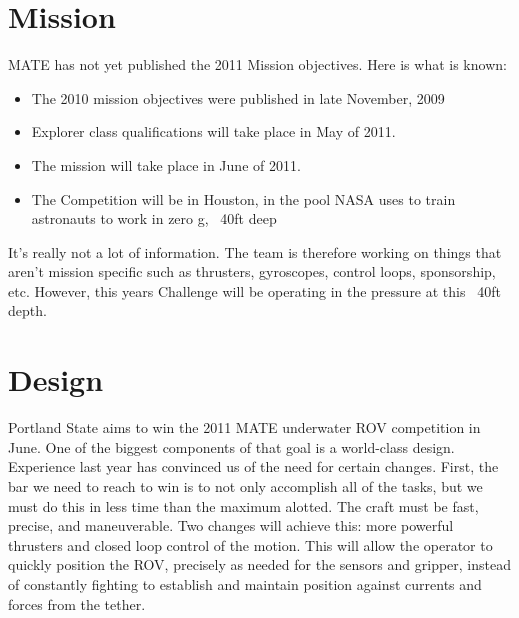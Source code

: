 \documentclass{proposalnsf}
\begin{document}
\section{Mission}

MATE has not yet published the 2011 Mission objectives. Here is what is known:
\begin{itemize}
\item The 2010 mission objectives were published in late November, 2009
\item Explorer class qualifications will take place in May of 2011.
\item The mission will take place in June of 2011.
\item The Competition will be in Houston, in the pool NASA uses to train astronauts to work in zero g, ~40ft deep
\end{itemize}
It's really not a lot of information. The team is therefore working on things that aren't mission specific such as thrusters, gyroscopes, control loops, sponsorship, etc.
However, this years Challenge will be operating in the pressure at this ~40ft depth.


\section{Design}

Portland State aims to win the 2011 MATE underwater ROV competition in June. One of the biggest components of that goal is a world-class design. Experience last year has convinced us of the need for certain changes.  First, the bar we need to reach to win is to not only accomplish all of the tasks, but we must do this in less time than the maximum alotted.  The craft must be fast, precise, and maneuverable.  Two changes will achieve this: more powerful thrusters and closed loop control of the motion.  This will allow the operator to quickly position the ROV, precisely as needed for the sensors and gripper, instead of constantly fighting to establish and maintain position against currents and forces from the tether.  
\end{document}
